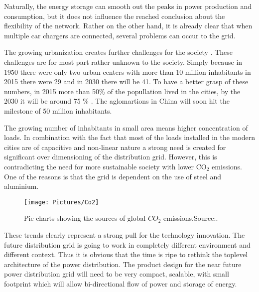 \documentclass[]{scrartcl}
\begin{document}
Naturally, the energy storage can smooth out the peaks in power production and consumption\cite{Luo2015}, but it does not influence the reached conclusion about the flexibility of the network. Rather on the other hand, it is already clear that when multiple car chargers are connected, several problems can occur to the grid\cite{Zhou2015}. 

The growing urbanization creates further challenges for the society \cite{Pulse2015}. These challenges are for most part rather unknown to the society.  Simply because in 1950 there were only two urban centers with more than 10 million inhabitants in 2015 there were 29 and in 2030 there will be 41\cite{Pulse2015}. To have a better grasp of these numbers, in 2015 more than 50\% of the popullation lived in the cities, by the 2030 it will be around 75 \% \cite{Pulse2015}. The aglomartions in China will soon hit the milestone of 50 million inhabitants.  




The growing number of inhabitants in small area means higher concentration of loads\cite{Garrity2009}. In combination with the fact that most of the loads installed in the modern cities are of capacitive and non-linear nature\cite{Boroyevich2007} a strong need is created for significant over dimensioning of the distribution grid. However, this is contradicting the need for more sustainable society with lower $\text{CO}_2$ emissions. One of the reasons is that the grid is dependent on the use of steel and aluminium\cite{Allwood2012}. 

\begin{figure}[h!]
\centering
\texttt{[image: Pictures/Co2]}
\caption{Pie charts showing the sources of global $CO_2$ emissions.Source:\cite{Allwood2012}.}
\label{fig:co2}
\end{figure}

\newpage

These trends clearly represent a strong pull for the technology innovation. The future distribution grid is going to work in completely different environment and different context. Thus it is obvious that the time is ripe to rethink the toplevel architecture of the power distribution. The product design for the near future power distribution grid will need to be very compact, scalable, with small footprint\cite{Garrity2009} which will allow bi-directional flow of power and storage of energy.



\end{document}
